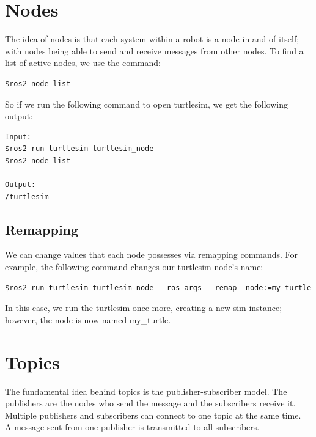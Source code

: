 \documentclass{exam}
\author{Omkar Tasgaonkar}
\begin{document}
\thispagestyle{firstpage}

\section{Nodes}
The idea of nodes is that each system within a robot is a node in and of itself; with nodes being able to send and receive messages from other nodes. To find a list of active nodes, we use the command:
\begin{verbatim}
$ros2 node list
\end{verbatim}
So if we run the following command to open turtlesim, we get the following output:
\begin{verbatim}
Input: 
$ros2 run turtlesim turtlesim_node
$ros2 node list

Output:
/turtlesim
\end{verbatim}

\subsection{Remapping}
We can change values that each node possesses via remapping commands. For example, the following command changes our turtlesim node's name:
\begin{verbatim}
$ros2 run turtlesim turtlesim_node --ros-args --remap__node:=my_turtle
\end{verbatim}
In this case, we run the turtlesim once more, creating a new sim instance; however, the node is now named my\_turtle.

\section{Topics}
The fundamental idea behind topics is the publisher-subscriber model. The publishers are the nodes who send the message and the subscribers receive it. Multiple publishers and subscribers can connect to one topic at the same time.\\

A message sent from one publisher is transmitted to all subscribers. 
\end{document}
